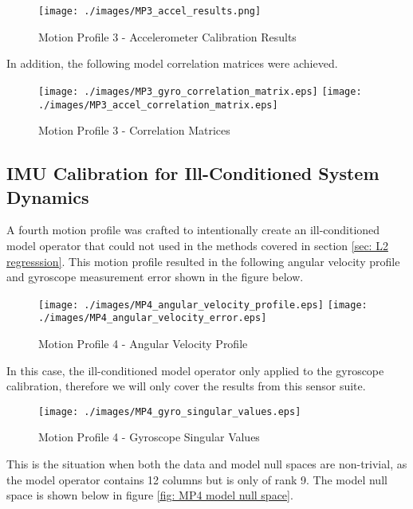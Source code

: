 \begin{figure}[h] 
	\centering
	\texttt{[image: ./images/MP3\_accel\_results.png]}
	\caption{Motion Profile 3 - Accelerometer Calibration Results}
	\label{fig: MP3 accel results}
\end{figure}
\FloatBarrier

In addition, the following model correlation matrices were achieved.

\begin{figure}[!h] 
	\centering
	\texttt{[image: ./images/MP3\_gyro\_correlation\_matrix.eps]} \hfill
	\texttt{[image: ./images/MP3\_accel\_correlation\_matrix.eps]}
	\caption{Motion Profile 3 - Correlation Matrices}
	\label{fig: MP3 correlation matrix}
\end{figure}
\FloatBarrier


\subsection{IMU Calibration for Ill-Conditioned System Dynamics}

A fourth motion profile was crafted to intentionally create an ill-conditioned model operator that could not used in the methods covered in section \ref{sec: L2 regresssion}. This motion profile resulted in the following angular velocity profile and gyroscope measurement error shown in the figure below. 

\begin{figure}[!h] 
	\centering
	\texttt{[image: ./images/MP4\_angular\_velocity\_profile.eps]} \hfill
	\texttt{[image: ./images/MP4\_angular\_velocity\_error.eps]}
	\caption{Motion Profile 4 - Angular Velocity Profile}
	\label{fig: MP4 angular velocity profile}
\end{figure}
\FloatBarrier

In this case, the ill-conditioned model operator only applied to the gyroscope calibration, therefore we will only cover the results from this sensor suite. 

\begin{figure}[h] 
	\centering
	\texttt{[image: ./images/MP4\_gyro\_singular\_values.eps]}
	\caption{Motion Profile 4 - Gyroscope Singular Values}
	\label{fig: MP4 gyro singular values}
\end{figure}
\FloatBarrier

This is the situation when both the data and model null spaces are non-trivial, as the model operator contains 12 columns but is only of rank 9. The model null space is shown below in figure \ref{fig: MP4 model null space}. 

